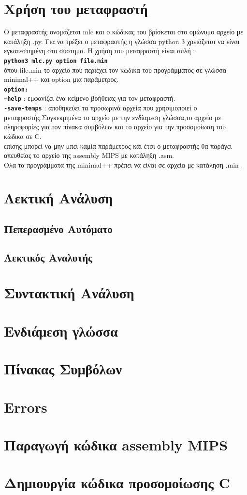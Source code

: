 \documentclass[12pt,a4paper,a4paper]{report}
\begin{document}
\chapter{Χρήση του μεταφραστή}
Ο μεταφραστής ονομάζεται mlc και ο κώδικας του βρίσκεται στο ομώνυμο αρχείο με κατάληξη .py. Για να τρέξει ο μεταφραστής η γλώσσα python 3 χρειάζεται να είναι εγκατεστημένη στο σύστημα. Η χρήση του μεταφραστή είναι απλή :\\
\texttt{\textbf{python3 mlc.py option file.min}}\\
όπου file.min το αρχείο που περιέχει τον κώδικα του προγράμματος σε γλώσσα minimal++ και option μια παράμετρος.\\
\texttt{\textbf{option:}}\\
\texttt{\textbf{--help}} : εμφανίζει ένα κείμενο βοήθειας για τον μεταφραστή.\\
\texttt{\textbf{-save-temps}} : αποθηκεύει τα προσωρινά αρχεία που χρησιμοποιεί ο μεταφραστής.Συγκεκριμένα το αρχείο με την ενδίαμεση γλώσσα,το αρχείο με πληροφορίες για τον πίνακα συμβόλων και το αρχείο για την προσομοίωση του κώδικα σε C.\\
επίσης μπορεί να μην μπει καμία παράμετρος και έτσι ο μεταφραστής θα παράγει απευθείας το αρχείο της assembly MIPS με κατάληξη .asm.\\
Όλα τα προγράμματα της minimal++ πρέπει να είναι σε αρχεία με κατάληση .min .\\
   

\chapter{Λεκτική Ανάλυση}
\section{Πεπερασμένο Αυτόματο}
\section{Λεκτικός Αναλυτής}

\chapter{Συντακτική Ανάλυση}
\chapter{Ενδιάμεση γλώσσα}
\chapter{Πίνακας Συμβόλων}
\chapter{Errors}
\chapter{Παραγωγή κώδικα assembly MIPS}
\chapter{Δημιουργία κώδικα προσομοίωσης C}
\end{document}
